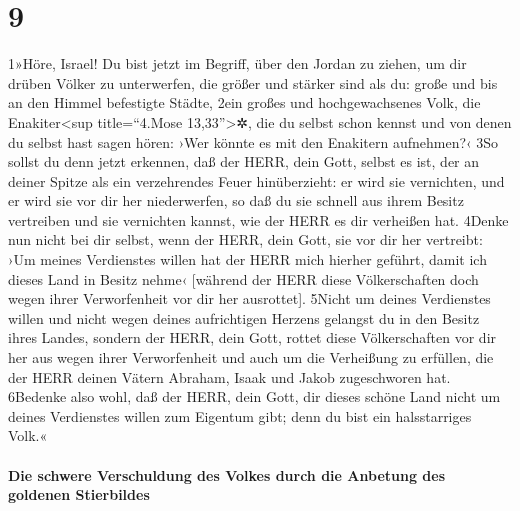 \hypertarget{section-8}{%
\section{9}\label{section-8}}

1»Höre, Israel! Du bist jetzt im Begriff, über den Jordan zu ziehen, um
dir drüben Völker zu unterwerfen, die größer und stärker sind als du:
große und bis an den Himmel befestigte Städte, 2ein großes und
hochgewachsenes Volk, die Enakiter\textless sup title=``4.Mose
13,33''\textgreater✲, die du selbst schon kennst und von denen du selbst
hast sagen hören: ›Wer könnte es mit den Enakitern aufnehmen?‹ 3So
sollst du denn jetzt erkennen, daß der HERR, dein Gott, selbst es ist,
der an deiner Spitze als ein verzehrendes Feuer hinüberzieht: er wird
sie vernichten, und er wird sie vor dir her niederwerfen, so daß du sie
schnell aus ihrem Besitz vertreiben und sie vernichten kannst, wie der
HERR es dir verheißen hat. 4Denke nun nicht bei dir selbst, wenn der
HERR, dein Gott, sie vor dir her vertreibt: ›Um meines Verdienstes
willen hat der HERR mich hierher geführt, damit ich dieses Land in
Besitz nehme‹ {[}während der HERR diese Völkerschaften doch wegen ihrer
Verworfenheit vor dir her ausrottet{]}. 5Nicht um deines Verdienstes
willen und nicht wegen deines aufrichtigen Herzens gelangst du in den
Besitz ihres Landes, sondern der HERR, dein Gott, rottet diese
Völkerschaften vor dir her aus wegen ihrer Verworfenheit und auch um die
Verheißung zu erfüllen, die der HERR deinen Vätern Abraham, Isaak und
Jakob zugeschworen hat. 6Bedenke also wohl, daß der HERR, dein Gott, dir
dieses schöne Land nicht um deines Verdienstes willen zum Eigentum gibt;
denn du bist ein halsstarriges Volk.«

\hypertarget{die-schwere-verschuldung-des-volkes-durch-die-anbetung-des-goldenen-stierbildes}{%
\paragraph{Die schwere Verschuldung des Volkes durch die Anbetung des
goldenen
Stierbildes}\label{die-schwere-verschuldung-des-volkes-durch-die-anbetung-des-goldenen-stierbildes}}

